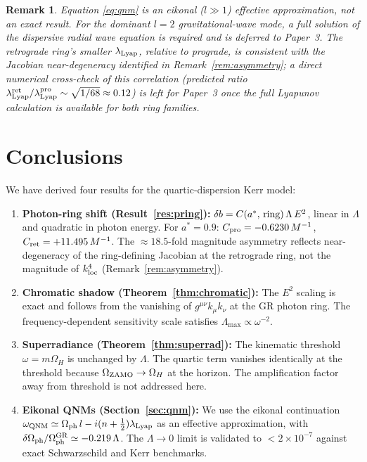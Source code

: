 \documentclass[12pt,a4paper]{article}
\newtheorem{remark}{Remark}
\newcommand{\OmH}{\Omega_H}
\newcommand{\Omph}{\Omega_{\rm ph}}
\newcommand{\lLyap}{\lambda_{\rm Lyap}}
\begin{document}
\begin{remark}
Equation \eqref{eq:qnm} is an eikonal ($l\gg 1$) effective
approximation, not an exact result. For the dominant $l=2$
gravitational-wave mode, a full solution of the dispersive radial
wave equation is required and is deferred to Paper~3. The retrograde
ring's smaller $\lLyap$, relative to prograde, is consistent with the
Jacobian near-degeneracy identified in Remark~\ref{rem:asymmetry};
a direct numerical cross-check of this correlation (predicted ratio
$\lLyap^{\rm ret}/\lLyap^{\rm pro}\sim\sqrt{1/68}\approx0.12$) is left
for Paper~3 once the full Lyapunov calculation is available for both
ring families.
\end{remark}

\section{Conclusions}

We have derived four results for the quartic-dispersion Kerr model:

\begin{enumerate}
  \item \textbf{Photon-ring shift (Result~\ref{res:pring}):}
    $\delta b = C(a^*,\,{\rm ring})\,\Lambda\,E^2$, linear in $\Lambda$
    and quadratic in photon energy. For $a^*=0.9$:
    $C_{\rm pro}=-0.6230\,M^{-1}$, $C_{\rm ret}=+11.495\,M^{-1}$.
    The $\approx18.5$-fold magnitude asymmetry reflects near-degeneracy
    of the ring-defining Jacobian at the retrograde ring, not the
    magnitude of $k_{\rm loc}^4$ (Remark~\ref{rem:asymmetry}).

  \item \textbf{Chromatic shadow (Theorem~\ref{thm:chromatic}):}
    The $E^2$ scaling is exact and follows from the vanishing of
    $g^{\mu\nu}k_\mu k_\nu$ at the GR photon ring.
    The frequency-dependent sensitivity scale satisfies
    $\Lambda_{\max}\propto\omega^{-2}$.

  \item \textbf{Superradiance (Theorem~\ref{thm:superrad}):}
    The kinematic threshold $\omega=m\OmH$ is unchanged by $\Lambda$.
    The quartic term vanishes identically at the threshold because
    $\Omega_{\rm ZAMO}\to\OmH$ at the horizon. The amplification
    factor away from threshold is not addressed here.

  \item \textbf{Eikonal QNMs (Section~\ref{sec:qnm}):}
    We use the eikonal continuation
    $\omega_{\rm QNM}\simeq\Omph\,l-i(n+\tfrac{1}{2})\lLyap$
    as an effective approximation, with
    $\delta\Omph/\Omph^{\rm GR}\simeq-0.219\,\Lambda$.
    The $\Lambda\to0$ limit is validated to $<2\times10^{-7}$ against
    exact Schwarzschild and Kerr benchmarks.
\end{enumerate}
\end{document}
